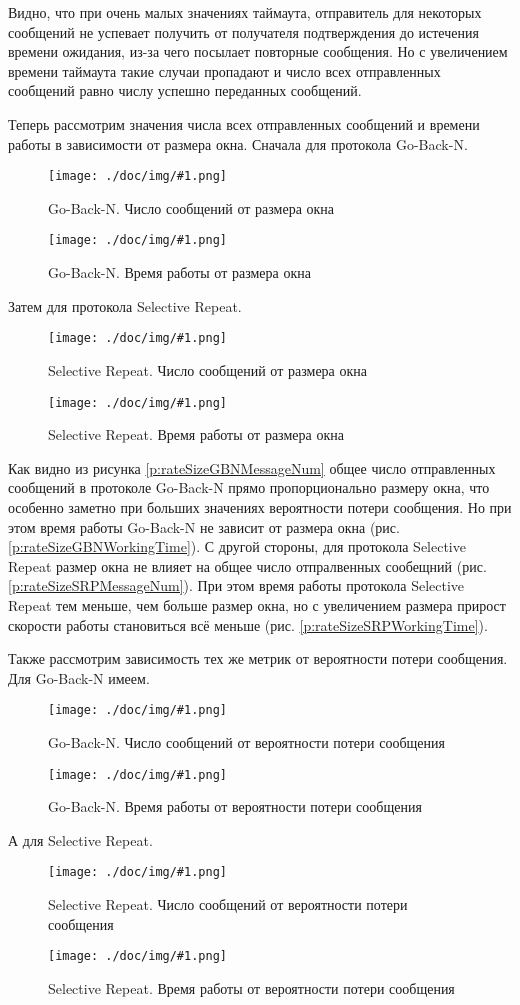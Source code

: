 \documentclass[a4paper,12pt]{article}
\newcommand{\plot}[3]{
    \label{#3}
    \begin{figure}[H]
        \begin{center}
            \texttt{[image: ./doc/img/\#1.png]}
            \caption{#2}
        \end{center}
    \end{figure}
}
\begin{document}
    Видно, что при очень малых значениях таймаута, отправитель для некоторых сообщений не успевает получить от получателя
    подтверждения до истечения времени ожидания, из-за чего посылает повторные сообщения.
    Но с увеличением времени таймаута такие случаи пропадают и число всех отправленных сообщений равно числу успешно переданных сообщений.

    Теперь рассмотрим значения числа всех отправленных сообщений и времени работы в зависимости от размера окна.
    Сначала для протокола Go-Back-N.

    \plot{rateSizeGBNMessageNum}{Go-Back-N. Число сообщений от размера окна}{p:rateSizeGBNMessageNum}
    \plot{rateSizeGBNWorkingTime}{Go-Back-N. Время работы от размера окна}{p:rateSizeGBNWorkingTime}

    Затем для протокола Selective Repeat.

    \plot{rateSizeSRPMessageNum}{Selective Repeat. Число сообщений от размера окна}{p:rateSizeSRPMessageNum}
    \plot{rateSizeSRPWorkingTime}{Selective Repeat. Время работы от размера окна}{p:rateSizeSRPWorkingTime}

    Как видно из рисунка \ref{p:rateSizeGBNMessageNum} общее число отправленных сообщений в протоколе Go-Back-N
    прямо пропорционально размеру окна, что особенно заметно при больших значениях вероятности потери сообщения.
    Но при этом время работы Go-Back-N не зависит от размера окна (рис. \ref{p:rateSizeGBNWorkingTime}).
    С другой стороны, для протокола Selective Repeat размер окна не влияет на общее число отпралвенных сообещний (рис. \ref{p:rateSizeSRPMessageNum}).
    При этом время работы протокола Selective Repeat тем меньше, чем больше размер окна,
    но с увеличением размера прирост скорости работы становиться всё меньше (рис. \ref{p:rateSizeSRPWorkingTime}). 

    Также рассмотрим зависимость тех же метрик от вероятности потери сообщения.
    Для Go-Back-N имеем.

    \plot{sizeRateGBNMessageNum}{Go-Back-N. Число сообщений от вероятности потери сообщения}{p:sizeRateGBNMessageNum}
    \plot{sizeRateGBNWorkingTime}{Go-Back-N. Время работы от вероятности потери сообщения}{p:sizeRateGBNWorkingTime}

    А для Selective Repeat.
    
    \plot{sizeRateSRPMessageNum}{Selective Repeat. Число сообщений от вероятности потери сообщения}{p:sizeRateSRPMessageNum}
    \plot{sizeRateSRPWorkingTime}{Selective Repeat. Время работы от вероятности потери сообщения}{p:sizeRateSRPWorkingTime}
\end{document}
